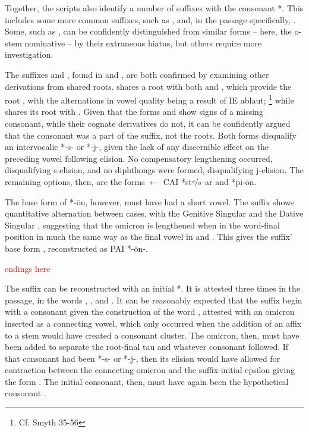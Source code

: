 \documentclass[draft]{turabian-researchpaper}
\begin{document}
\maketitle
%



Together, the scripts also identify a number of suffixes with the consonant *\w.
This includes some more common suffixes, such as , and,
in the passage specifically, .
Some, such as , can be confidently distinguished from similar forms --
here, the o-stem nominative  -- by their extraneous hiatus,
but others require more investigation.

The suffixes  and , found in  and ,
are both confirmed by examining other derivations from shared roots. 
shares a root with both  and , which provide
the root , with the alternations in vowel quality being a result
of IE ablaut; \footnote{Cf. Smyth 35-56} while  shares its root with
. Given that the forms  and  show signs
of a missing consonant, while their cognate derivatives do not, it can be
confidently argued that the consonant was a part of the suffix, not the roots.
Both forms disqualify an intervocalic *-s- or *-j-, given the lack of any
discernible effect on the preceding vowel following elision.
No compensatory lengthening occurred, disqualifying s-elision, and no
diphthongs were formed, disqualifying j-elision. The remaining options, then,
are the forms  $\gets$ CAI *st$\nicefrac{e}{a}$-\w ar and
*pi-\w \=on. 

The base form of *-\w\=on, however, must have had a short vowel.
The suffix shows quantitative alternation between cases, with the
Genitive Singular  and the Dative Singular ,
suggesting that the omicron  is lengthened when in the
word-final position in much the same way as the final vowel in
 and . This gives the suffix' base form
, reconstructed as PAI *-\w\u{o}n-.

\textcolor{red}{ endings here}

The suffix  can be reconstructed with an initial *\w.
It is attested three times in the passage, in the words ,
, and .
It can be reasonably expected that the suffix begin with a consonant
given the construction of the word , attested with
an omicron  inserted as a connecting vowel, which only
occurred when the addition of an affix to a stem would have created a
consonant cluster. The omicron, then, must have been added to separate
the root-final tau  and whatever consonant followed.
If that consonant had been *-s- or *-j-, then its elision would have
allowed for contraction between the connecting omicron 
and the suffix-initial epsilon  giving the form
. The initial consonant, then, must have again been the
hypothetical consonant \w.
\end{document}
